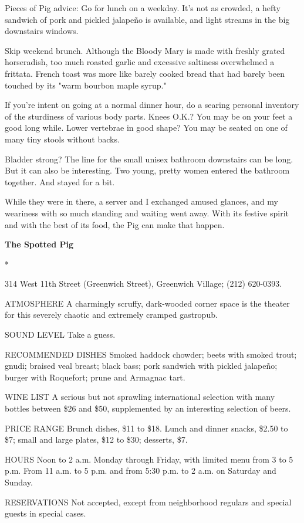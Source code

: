 Pieces of Pig advice: Go for lunch on a weekday. It's not as crowded, a
hefty sandwich of pork and pickled jalapeño is available, and light
streams in the big downstairs windows.

Skip weekend brunch. Although the Bloody Mary is made with freshly
grated horseradish, too much roasted garlic and excessive saltiness
overwhelmed a frittata. French toast was more like barely cooked bread
that had barely been touched by its "warm bourbon maple syrup."

If you're intent on going at a normal dinner hour, do a searing personal
inventory of the sturdiness of various body parts. Knees O.K.? You may
be on your feet a good long while. Lower vertebrae in good shape? You
may be seated on one of many tiny stools without backs.

Bladder strong? The line for the small unisex bathroom downstairs can be
long. But it can also be interesting. Two young, pretty women entered
the bathroom together. And stayed for a bit.

While they were in there, a server and I exchanged amused glances, and
my weariness with so much standing and waiting went away. With its
festive spirit and with the best of its food, the Pig can make that
happen.

\textbf{The Spotted Pig}

*

314 West 11th Street (Greenwich Street), Greenwich Village; (212)
620-0393.

ATMOSPHERE A charmingly scruffy, dark-wooded corner space is the theater
for this severely chaotic and extremely cramped gastropub.

SOUND LEVEL Take a guess.

RECOMMENDED DISHES Smoked haddock chowder; beets with smoked trout;
gnudi; braised veal breast; black bass; pork sandwich with pickled
jalapeño; burger with Roquefort; prune and Armagnac tart.

WINE LIST A serious but not sprawling international selection with many
bottles between \$26 and \$50, supplemented by an interesting selection
of beers.

PRICE RANGE Brunch dishes, \$11 to \$18. Lunch and dinner snacks, \$2.50
to \$7; small and large plates, \$12 to \$30; desserts, \$7.

HOURS Noon to 2 a.m. Monday through Friday, with limited menu from 3 to
5 p.m. From 11 a.m. to 5 p.m. and from 5:30 p.m. to 2 a.m. on Saturday
and Sunday.

RESERVATIONS Not accepted, except from neighborhood regulars and special
guests in special cases.

